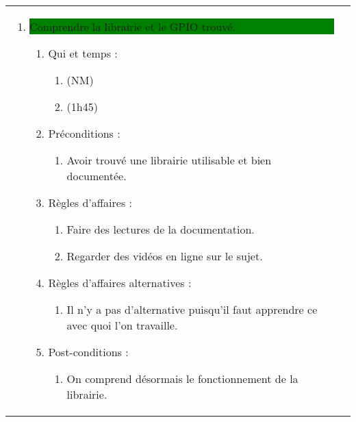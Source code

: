 \begin{longtable}{|l|p{}|}
\begin{enumerate}[label*=\arabic*.]
             \item \colorbox{Green}{\parbox{13cm}{Comprendre la librairie et le GPIO trouvé.}}
                \begin{enumerate}[label*=\arabic*.]
                                \item Qui et temps :
                                \begin{enumerate}[label*=\arabic*.]
                                    \item (NM)
                                    \item (1h45)
                                \end{enumerate}
                                \item Préconditions :
                                \begin{enumerate}[label*=\arabic*.]
                                    \item Avoir trouvé une librairie utilisable et bien documentée.
                                \end{enumerate}
                                \item Règles d'affaires :
                                \begin{enumerate}[label*=\arabic*.]
                                    \item Faire des lectures de la documentation.
                                    \item Regarder des vidéos en ligne sur le sujet.
                                \end{enumerate}
                                \item Règles d'affaires alternatives :
                                \begin{enumerate}[label*=\arabic*.]
                                    \item Il n'y a pas d'alternative puisqu'il faut apprendre ce avec quoi l'on travaille.
                                \end{enumerate}
                                \item Post-conditions :
                                \begin{enumerate}[label*=\arabic*.]
                                    \item On comprend désormais le fonctionnement de la librairie.
                                \end{enumerate}
                            \end{enumerate}                

\end{enumerate}
\end{longtable}
